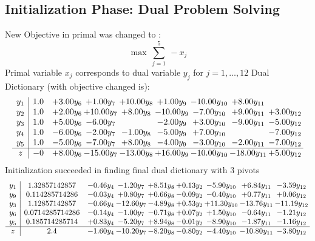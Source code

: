 \documentclass[8pt]{article}
\begin{document}
\subsection{Initialization Phase: Dual Problem Solving}
New Objective in primal was changed to : \[ \max\ \sum_{j=1}^{5}\ - x_j \] 
Primal variable $x_j$ corresponds to dual variable $y_j$ for $j = 1,\ldots,12$
Dual Dictionary (with objective changed is): 
\[\begin{array}{c| c c@{\hskip 2pt} c@{\hskip 2pt} c@{\hskip 2pt} c@{\hskip 2pt} c@{\hskip 2pt} c@{\hskip 2pt} c@{\hskip 2pt} }
 y_{1}   &  1.0 & +  3.00 y_{6} & +  1.00 y_{7} & + 10.00 y_{8} & +  1.00 y_{9} & -10.00 y_{10} & +  8.00 y_{11} &   \\
 y_{2}   &  1.0 & +  2.00 y_{6} & + 10.00 y_{7} & +  8.00 y_{8} & -10.00 y_{9} & -7.00 y_{10} & +  9.00 y_{11} & +  3.00 y_{12}\\
 y_{3}   &  1.0 & +  5.00 y_{6} & -6.00 y_{7} &   & -2.00 y_{9} & +  3.00 y_{10} & -9.00 y_{11} & -5.00 y_{12}\\
 y_{4}   &  1.0 & -6.00 y_{6} & -2.00 y_{7} & -1.00 y_{8} & -5.00 y_{9} & +  7.00 y_{10} &   & -7.00 y_{12}\\
 y_{5}   &  1.0 & -5.00 y_{6} & -7.00 y_{7} & +  8.00 y_{8} & -4.00 y_{9} & -3.00 y_{10} & -2.00 y_{11} & -7.00 y_{12}\\
\hline
z    &  -0 & +  8.00 y_{6} & -15.00 y_{7} & -13.00 y_{8} & + 16.00 y_{9} & -10.00 y_{10} & -18.00 y_{11} & +  5.00 y_{12}\\
\end{array}\]
Initialization succeeded in finding final dual dictionary with 3 pivots
\[\begin{array}{c| c c@{\hskip 2pt} c@{\hskip 2pt} c@{\hskip 2pt} c@{\hskip 2pt} c@{\hskip 2pt} c@{\hskip 2pt} c@{\hskip 2pt} }
 y_{1}   &  1.32857142857 & -0.46 y_{4} & -1.20 y_{7} & +  8.51 y_{8} & +  0.13 y_{2} & -5.90 y_{10} & +  6.84 y_{11} & -3.59 y_{12}\\
 y_{9}   &  0.114285714286 & -0.03 y_{4} & +  0.80 y_{7} & +  0.66 y_{8} & -0.09 y_{2} & -0.40 y_{10} & +  0.77 y_{11} & +  0.06 y_{12}\\
 y_{3}   &  1.12857142857 & -0.66 y_{4} & -12.60 y_{7} & -4.89 y_{8} & +  0.53 y_{2} & + 11.30 y_{10} & -13.76 y_{11} & -11.19 y_{12}\\
 y_{6}   &  0.0714285714286 & -0.14 y_{4} & -1.00 y_{7} & -0.71 y_{8} & +  0.07 y_{2} & +  1.50 y_{10} & -0.64 y_{11} & -1.21 y_{12}\\
 y_{5}   &  0.185714285714 & +  0.83 y_{4} & -5.20 y_{7} & +  8.94 y_{8} & -0.01 y_{2} & -8.90 y_{10} & -1.87 y_{11} & -1.16 y_{12}\\
\hline
z    &  2.4 & -1.60 y_{4} & -10.20 y_{7} & -8.20 y_{8} & -0.80 y_{2} & -4.40 y_{10} & -10.80 y_{11} & -3.80 y_{12}\\
\end{array}\]
\end{document}
